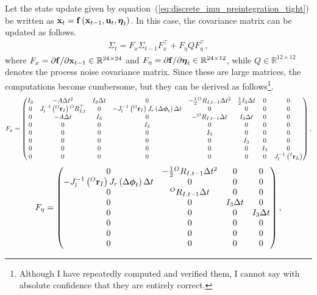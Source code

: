 Let the state update given by equation~(\ref{eq:discrete_imu_preintegration_tight}) be written as ${\bf x}_{t} = {\bf f} \left( {\bf x}_{t-1}, {\bf u}_{t}, \boldsymbol \eta_{t} \right)$.
In this case, the covariance matrix can be updated as follows.
%
\begin{align}
  \Sigma_{t} = F_{x} \Sigma_{t-1} F_{x}^{\top} + F_{\eta} Q F_{\eta}^{\top},
\end{align}
%
where $F_{x} = \partial {\bf f} / \partial {\bf x}_{t-1} \in \mathbb{R}^{24 \times 24}$ and $F_{\eta} = \partial {\bf f} / \partial \boldsymbol \eta_{t} \in \mathbb{R}^{24 \times 12}$, while $Q \in \mathbb{R}^{12 \times 12}$ denotes the process noise covariance matrix.
Since these are large matrices, the computations become cumbersome, but they can be derived as follows\footnote{Although I have repeatedly computed and verified them, I cannot say with absolute confidence that they are entirely correct.}.
%
\begin{align}
  F_{x} = \left( \begin{matrix}
    I_{3} & -A \Delta t^{2} & I_{3} \Delta t & 0 & -\frac{1}{2} {}^{O}R_{I, t-1} \Delta t^{2} & \frac{1}{2} I_{3} \Delta t & 0 & 0 \\
%
    0 & J_{l}^{-1} \left( {}^{O}{\bf r}_{I} \right) {}^{O}R_{I, t}^{\top} & 0 & -J_{l}^{-1} \left( {}^{O}{\bf r}_{I} \right) J_{r} \left( \Delta \boldsymbol \phi_{t} \right) \Delta t & 0 & 0 & 0 & 0 \\
%
    0 & -A \Delta t & I_{3} & 0 & -{}^{O}R_{I, t-1} \Delta t & I_{3} \Delta t & 0 & 0 \\
%
    0 & 0 & 0 & I_{3} & 0 & 0 & 0 & 0 \\
%
    0 & 0 & 0 & 0 & I_{3} & 0 & 0 & 0 \\
%
    0 & 0 & 0 & 0 & 0 & I_{3} & 0 & 0 \\
%
    0 & 0 & 0 & 0 & 0 & 0 & I_{3} & 0 \\
%
    0 & 0 & 0 & 0 & 0 & 0 & 0 & J_{l}^{-1} \left( {}^{I}{\bf r}_{L} \right) \\
  \end{matrix} \right),
  \label{eq:covariance_update_fx}
\end{align}
%
\begin{align}
  F_{\eta} = \left( \begin{matrix}
    0 & -\frac{1}{2} {}^{O}R_{I, t-1} \Delta t^{2} & 0 & 0 \\
%
    -J_{l}^{-1} \left( {}^{O}{\bf r}_{I} \right) J_{r} \left( \Delta \boldsymbol \phi_{t} \right) \Delta t & 0 & 0 & 0 \\
%
    0 & {}^{O}R_{I, t-1} \Delta t & 0 & 0 \\
%
    0 & 0 & I_{3} \Delta t & 0 \\
%
    0 & 0 & 0 & I_{3} \Delta t \\
%
    0 & 0 & 0 & 0 \\
%
    0 & 0 & 0 & 0 \\
%
    0 & 0 & 0 & 0 \\
  \end{matrix} \right),
  \label{eq:covariance_update_feta}
\end{align}
